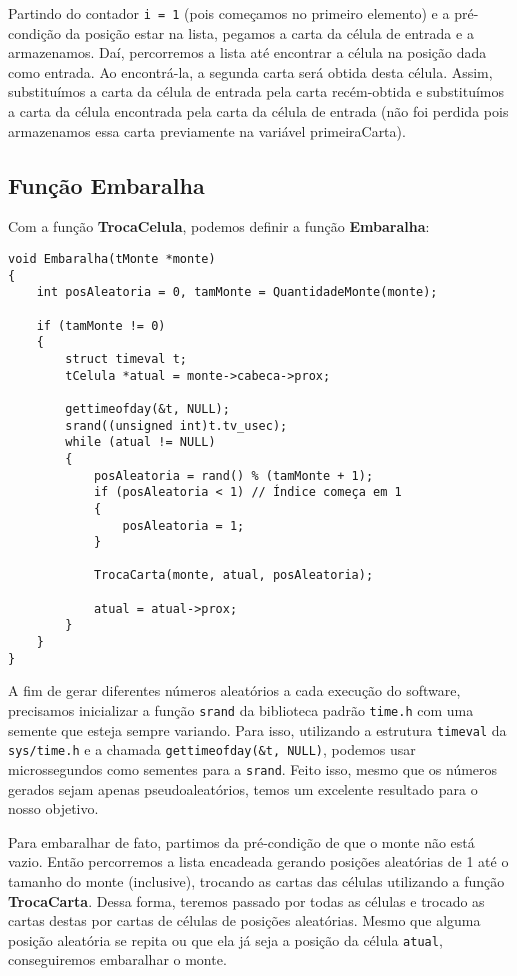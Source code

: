 \documentclass[12pt, oneside, a4paper, brazil]{abntex2}
\begin{document}
Partindo do contador \texttt{i = 1} (pois começamos no primeiro elemento) e a pré-condição da posição estar na lista, pegamos a carta da célula de entrada e a armazenamos. 
Daí, percorremos a lista até encontrar a célula na posição dada como entrada. Ao encontrá-la, a segunda carta será obtida desta célula. Assim, substituímos a carta da célula de entrada pela carta recém-obtida e substituímos a carta da célula encontrada pela carta da célula de entrada (não foi perdida pois armazenamos essa carta previamente na variável primeiraCarta).

\subsection{Função Embaralha}
Com a função \textbf{TrocaCelula}, podemos definir a função \textbf{Embaralha}:
\begin{lstlisting}
void Embaralha(tMonte *monte)
{
    int posAleatoria = 0, tamMonte = QuantidadeMonte(monte);

    if (tamMonte != 0)
    {
        struct timeval t;
        tCelula *atual = monte->cabeca->prox;

        gettimeofday(&t, NULL);
        srand((unsigned int)t.tv_usec);
        while (atual != NULL)
        {
            posAleatoria = rand() % (tamMonte + 1);
            if (posAleatoria < 1) // Índice começa em 1
            {
                posAleatoria = 1;
            }

            TrocaCarta(monte, atual, posAleatoria);

            atual = atual->prox;
        }
    }
}
\end{lstlisting}
A fim de gerar diferentes números aleatórios a cada execução do software, precisamos inicializar a função \texttt{srand} da biblioteca padrão \texttt{time.h} com uma semente que esteja sempre variando. Para isso, utilizando a estrutura \texttt{timeval} da \texttt{sys/time.h} e a chamada \texttt{gettimeofday(\&t, NULL)}, podemos usar microssegundos como sementes para a \texttt{srand}. Feito isso, mesmo que os números gerados sejam apenas pseudoaleatórios, temos um excelente resultado para o nosso objetivo.

Para embaralhar de fato, partimos da pré-condição de que o monte não está vazio. Então percorremos a lista encadeada gerando posições aleatórias de 1 até o tamanho do monte (inclusive), trocando as cartas das células utilizando a função \textbf{TrocaCarta}. Dessa forma, teremos passado por todas as células e trocado as cartas destas por cartas de células de posições aleatórias. Mesmo que alguma posição aleatória se repita ou que ela já seja a posição da célula \texttt{atual}, conseguiremos embaralhar o monte.
\end{document}
